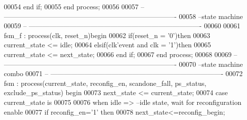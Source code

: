 \begin{DoxyCode}
00054     \textcolor{keywordflow}{end} \textcolor{keywordflow}{if};
00055 \textcolor{keywordflow}{end} \textcolor{keywordflow}{process};
00056 
00057 \textcolor{keyword}{-- ----------------------------------------------------------------------------}
00058 \textcolor{keyword}{--state machine}
00059 \textcolor{keyword}{-- ----------------------------------------------------------------------------}
00060 
00061 fsm\_f : \textcolor{keywordflow}{process}(clk, reset_n)\textcolor{keywordflow}{begin}
00062     \textcolor{keywordflow}{if}\textcolor{vhdlchar}{(}\textcolor{vhdlchar}{reset_n} \textcolor{vhdlchar}{=} \textcolor{vhdlchar}{'}\textcolor{vhdllogic}{}\textcolor{vhdllogic}{0}\textcolor{vhdlchar}{'}\textcolor{vhdlchar}{)}\textcolor{keywordflow}{then}
00063         \textcolor{vhdlchar}{current_state} \textcolor{vhdlchar}{<=} \textcolor{vhdlchar}{idle};
00064     \textcolor{keywordflow}{elsif}\textcolor{vhdlchar}{(}\textcolor{vhdlchar}{clk}\textcolor{vhdlchar}{'}\textcolor{vhdlkeyword}{event} \textcolor{keywordflow}{and} \textcolor{vhdlchar}{clk} \textcolor{vhdlchar}{=} \textcolor{vhdlchar}{'}\textcolor{vhdllogic}{}\textcolor{vhdllogic}{1}\textcolor{vhdlchar}{'}\textcolor{vhdlchar}{)}\textcolor{keywordflow}{then} 
00065         \textcolor{vhdlchar}{current_state} \textcolor{vhdlchar}{<=} \textcolor{vhdlchar}{next_state};
00066     \textcolor{keywordflow}{end} \textcolor{keywordflow}{if}; 
00067 \textcolor{keywordflow}{end} \textcolor{keywordflow}{process};
00068 
00069 \textcolor{keyword}{-- ----------------------------------------------------------------------------}
00070 \textcolor{keyword}{--state machine combo}
00071 \textcolor{keyword}{-- ----------------------------------------------------------------------------}
00072 fsm : \textcolor{keywordflow}{process}(current_state, reconfig_en, scandone_fall, ps_status, 
      exclude_ps_status) \textcolor{keywordflow}{begin}
00073     \textcolor{vhdlchar}{next_state} \textcolor{vhdlchar}{<=} \textcolor{vhdlchar}{current_state};
00074     \textcolor{keywordflow}{case} \textcolor{vhdlchar}{current_state} \textcolor{keywordflow}{is}
00075       
00076         \textcolor{keywordflow}{when} \textcolor{vhdlchar}{idle} \textcolor{vhdlchar}{=}\textcolor{vhdlchar}{>}\textcolor{keyword}{ --idle state, wait for reconfiguration enable}
00077             \textcolor{keywordflow}{if} \textcolor{vhdlchar}{reconfig_en}\textcolor{vhdlchar}{=}\textcolor{vhdlchar}{'}\textcolor{vhdllogic}{}\textcolor{vhdllogic}{1}\textcolor{vhdlchar}{'} \textcolor{keywordflow}{then}
00078                 \textcolor{vhdlchar}{next_state}\textcolor{vhdlchar}{<=}\textcolor{vhdlchar}{reconfig\_begin};

\end{DoxyCode}
